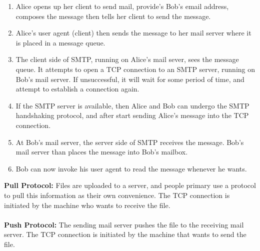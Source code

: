 \documentclass[]{article}
\begin{document}
\begin{enumerate}
	\item Alice opens up her client to send mail, provide's Bob's email address, composes the message then tells her client to send the message. 
	\item Alice's user agent (client) then sends the message to her mail server where it is placed in a message queue. 
	\item The client side of SMTP, running on Alice's mail sever, sees the message queue. It attempts to open a TCP connection to an SMTP server, running on Bob's mail server. If unsuccessful, it will wait for some period of time, and attempt to establish a connection again. 
	\item If the SMTP server is available, then Alice and Bob can undergo the SMTP handshaking protocol, and after start sending Alice's message into the TCP connection. 
	\item At Bob's mail server, the server side of SMTP receives the message. Bob's mail server than places the message into Bob's mailbox. 
	\item Bob can now invoke his user agent to read the message whenever he wants.  
\end{enumerate}
\textcolor{Emerald}{\textbf{Pull Protocol:}} Files are uploaded to a server, and people primary use a protocol to pull this information as their own convenience. The TCP connection is initiated by the machine who wants to receive the file.\\\\
\textcolor{Emerald}{\textbf{Push Protocol:}} The sending mail server pushes the file to the receiving mail server. The TCP connection is initiated by the machine that wants to send the file. 
\end{document}
